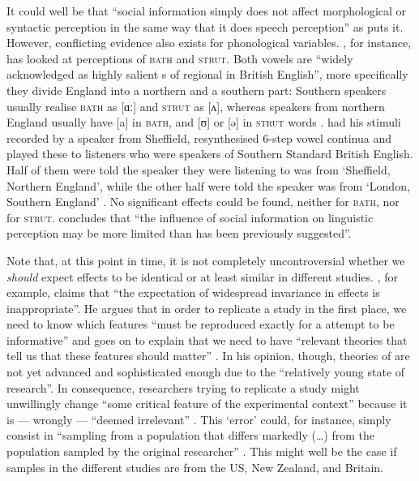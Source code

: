 It could well be that ``social information simply does not affect morphological or syntactic perception in the same way that it does speech perception'' as \textcite[229]{squires2013} puts it.
However, conflicting evidence also exists for phonological variables.
\textcite{lawrence2015}, for instance, has looked at perceptions of \textsc{bath} and \textsc{strut}.
Both vowels are ``widely acknowledged as highly salient s of regional  in British English'', more specifically they divide England into a northern and a southern part: Southern speakers usually realise \textsc{bath} as [ɑː] and \textsc{strut} as [ʌ], whereas speakers from northern England usually have [a] in \textsc{bath}, and [ʊ] or [ə] in \textsc{strut} words \parencite[cf.][1]{lawrence2015}.
\citeauthor{lawrence2015} had his stimuli recorded by a speaker from Sheffield, resynthesised 6-step vowel continua and played these to listeners who were speakers of Southern Standard British English.
Half of them were told the speaker they were listening to was from `Sheffield, Northern England', while the other half were told the speaker was from `London, Southern England' \parencite[cf.][2--3]{lawrence2015}.
No significant  effects could be found, neither for \textsc{bath}, nor for \textsc{strut}.
\textcite[cf.][4]{lawrence2015} concludes that ``the influence of social information on linguistic perception may be more limited than has been previously suggested''.

Note that, at this point in time, it is not completely uncontroversial whether we \emph{should} expect  effects to be identical or at least similar in different studies.
\textcite[45]{cesario2014}, for example, claims that ``the expectation of widespread invariance in  effects is inappropriate''.
He argues that in order to replicate a study in the first place, we need to know which features ``must be reproduced exactly for a  attempt to be informative'' and goes on to explain that we need to have ``relevant theories that tell us that these features should matter'' \parencite[42]{cesario2014}.
In his opinion, though, theories of  are not yet advanced and sophisticated enough due to the ``relatively young state of  research''.
In consequence, researchers trying to replicate a study might unwillingly change ``some critical feature of the experimental context'' because it is --- wrongly --- ``deemed irrelevant'' \parencite[43]{cesario2014}.
This `error' could, for instance, simply consist in ``sampling from a population that differs markedly (\ldots) from the population sampled by the original researcher'' \parencite[43]{cesario2014}.
This might well be the case if samples in the different studies are from the US, New Zealand, and Britain.

